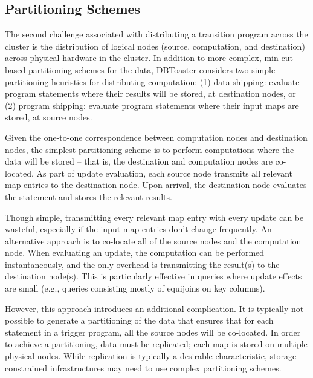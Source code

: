 \subsection{Partitioning Schemes}
The second challenge associated with distributing a transition program across
the cluster is the distribution of logical nodes (source, computation, and
destination) across physical hardware in the cluster.  In addition to more
complex, min-cut based partitioning schemes for the data, DBToaster considers
two simple partitioning heuristics for distributing computation:
(1) data shipping: evaluate program statements where their
results will be stored, at destination nodes, or
(2) program shipping: evaluate program statements where their input maps are
stored, at source nodes.

Given the one-to-one correspondence between computation nodes and destination
nodes, the simplest partitioning scheme is to perform computations where the
data will be stored -- that is, the destination and computation nodes are
co-located.  As part of update evaluation, each source node transmits all
relevant map entries to the destination node.  Upon arrival, the destination
node evaluates the statement and stores the relevant results.

Though simple, transmitting every relevant map entry with every update can be
wasteful, especially if the input map entries don't change frequently.  An
alternative approach is to co-locate all of the source nodes and the computation
node.  When evaluating an update, the computation can be performed
instantaneously, and the only overhead is transmitting the result(s) to the
destination node(s).  This is particularly effective in queries where update
effects are small (e.g., queries consisting mostly of equijoins on key columns).

However, this approach introduces an additional complication.  It is typically
not possible to generate a partitioning of the data that ensures that for each
statement in a trigger program, all the source nodes will be co-located.  In
order to achieve a partitioning, data must be replicated; each map is stored on
multiple physical nodes.  While replication is typically a desirable
characteristic, storage-constrained infrastructures may need to use
complex partitioning schemes.

